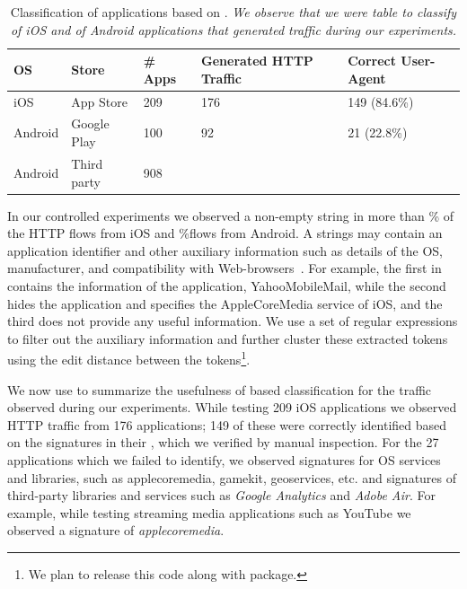 \begin{table}
    \centering
    \begin{small}
    \begin{tabular}{|p{}|p{}|p{}|p{}|p{}|}
       \hline
       {\bf OS}&{\bf Store}&{\bf \# Apps}&{\bf Generated HTTP Traffic}& {\bf Correct User-Agent} \tabularnewline
       \hline
       iOS     & App Store   & 209 & 176 & 149 (84.6\%) \tabularnewline
       Android & Google Play & 100 & 92  & 21 (22.8\%)  \tabularnewline
       Android & Third party & 908 &     &  \tabularnewline
       \hline
    \end{tabular}
    \end{small}
    \caption{Classification of applications based on \useragent. \emph{We observe that we were table to classify \tbd{} of iOS and \tbd{} of Android applications that generated traffic during our experiments.}}
    \label{tab:classification-success}
\end{table}


In our controlled experiments we observed a non-empty \useragent string in more than \% of the HTTP flows from iOS and \%flows from Android. 
A \useragent strings may contain an application identifier and other auxiliary information such as details of the OS, manufacturer, and compatibility with Web-browsers~\cite{mozilla:useragentdetection}. 
For example, the first \useragent in  contains the information of the application, YahooMobileMail, while the second \useragent hides the application and specifies the AppleCoreMedia service of iOS, and the third does not provide any useful information. 
We use a set of regular expressions to filter out the auxiliary information and further cluster these extracted tokens using the edit distance between the tokens\footnote{We plan to release this code along with \platname package.}.

We now use  to summarize the usefulness of \useragent based classification for the traffic observed during our experiments. 
While testing 209 iOS applications we observed HTTP traffic from 176 applications; 149 of these were correctly identified based on the signatures in their \useragent, which we verified by manual inspection.
For the 27 applications which we failed to identify, we observed signatures for OS services and libraries, such as applecoremedia, gamekit, geoservices, etc. and signatures of third-party libraries and services such as \emph{Google Analytics} and \emph{Adobe Air}.
For example, while testing streaming media applications such as YouTube we observed a signature of \emph{applecoremedia}.


